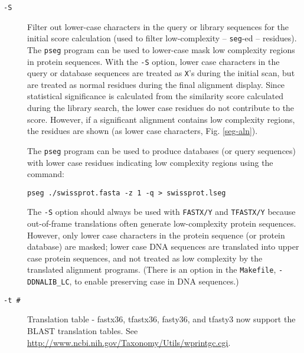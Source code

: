 \documentclass[11pt]{article}
\begin{document}
\begin{description}
\item[\texttt{-S}] Filter out lower-case characters in the query or
  library sequences for the initial score calculation (used to filter
  low-complexity -- \texttt{seg}-ed -- residues).  The \texttt{pseg}
  program \cite{woo935} can be used to lower-case mask low complexity
  regions in protein sequences. With the \texttt{-S} option, lower
  case characters in the query or database sequences are treated as
  \texttt{X}'s during the initial scan, but are treated as normal
  residues during the final alignment display.  Since statistical
  significance is calculated from the similarity score calculated
  during the library search, the lower case residues do not contribute
  to the score.  However, if a significant alignment contains low
  complexity regions, the residues are shown (as lower
  case characters, Fig. \ref{seg-aln}).

The \texttt{pseg} program can be used to produce databases (or query
sequences) with lower case residues indicating low complexity regions
using the command:
\begin{verbatim}
pseg ./swissprot.fasta -z 1 -q > swissprot.lseg
\end{verbatim}

The \texttt{-S} option should always be used with \texttt{FASTX/Y} and
\texttt{TFASTX/Y} because out-of-frame translations often generate
low-complexity protein sequences.  However, only lower case characters
in the protein sequence (or protein database) are masked; lower case
DNA sequences are translated into upper case protein sequences, and
not treated as low complexity by the translated alignment
programs. (There is an option in the \texttt{Makefile},
\texttt{-DDNALIB\_LC}, to enable preserving case in DNA sequences.)

\item[\texttt{-t \#}]
Translation table - fastx36, tfastx36, fasty36, and
tfasty3 now support the BLAST translation tables.  See
\url{http://www.ncbi.nih.gov/Taxonomy/Utils/wprintgc.cgi}.


\end{description}
\end{document}

